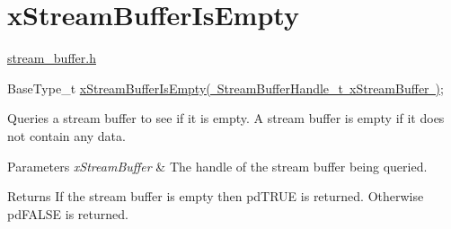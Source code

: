\hypertarget{group__x_stream_buffer_is_empty}{}\section{x\+Stream\+Buffer\+Is\+Empty}
\label{group__x_stream_buffer_is_empty}
\mbox{\hyperlink{stream__buffer_8h}{stream\+\_\+buffer.\+h}}


\begin{DoxyPre}
BaseType\_t \mbox{\hyperlink{stream__buffer_8h_af65cd558025ddc29ca68fba1b3f5dc19}{xStreamBufferIsEmpty( StreamBufferHandle\_t xStreamBuffer )}};
\end{DoxyPre}


Queries a stream buffer to see if it is empty. A stream buffer is empty if it does not contain any data.


\begin{DoxyParams}{Parameters}
{\em x\+Stream\+Buffer} & The handle of the stream buffer being queried.\\
\hline
\end{DoxyParams}
\begin{DoxyReturn}{Returns}
If the stream buffer is empty then pd\+T\+R\+UE is returned. Otherwise pd\+F\+A\+L\+SE is returned. 
\end{DoxyReturn}
